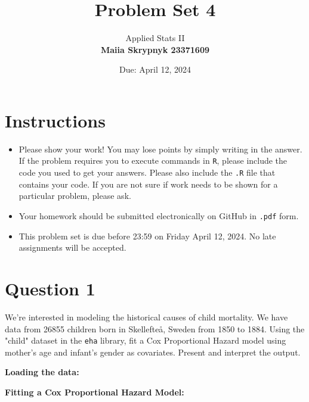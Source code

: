 \documentclass[12pt,letterpaper]{article}
\title{Problem Set 4}
\date{Due: April 12, 2024}
\author{Applied Stats II \\ \vspace{\baselineskip}
	\textbf{Maiia Skrypnyk 23371609}}
\begin{document}
	\maketitle
	\section*{Instructions}
	\begin{itemize}
	\item Please show your work! You may lose points by simply writing in the answer. If the problem requires you to execute commands in \texttt{R}, please include the code you used to get your answers. Please also include the \texttt{.R} file that contains your code. If you are not sure if work needs to be shown for a particular problem, please ask.
	\item Your homework should be submitted electronically on GitHub in \texttt{.pdf} form.
	\item This problem set is due before 23:59 on Friday April 12, 2024. No late assignments will be accepted.

	\end{itemize}

	\vspace{.25cm}
\section*{Question 1}
\vspace{.25cm}
\noindent We're interested in modeling the historical causes of child mortality. We have data from 26855 children born in Skellefteå, Sweden from 1850 to 1884. Using the "child" dataset in the \texttt{eha} library, fit a Cox Proportional Hazard model using mother's age and infant's gender as covariates. Present and interpret the output.

\textbf{Loading the data:}

 

\textbf{Fitting a Cox Proportional Hazard Model:}

 
\end{document}
